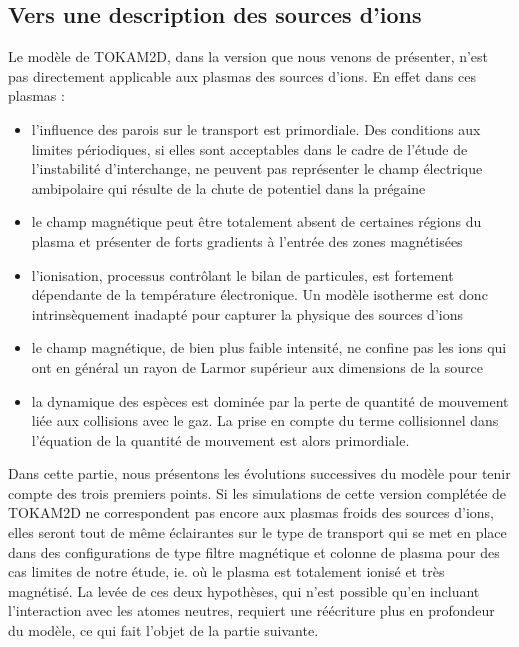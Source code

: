 \begin{refsection}
\section{Vers une description des sources d'ions}

Le modèle de TOKAM2D, dans la version que nous venons de présenter, n'est pas
directement applicable aux plasmas des sources d'ions. En effet dans
ces plasmas :

\begin{itemize}
	\item l'influence des parois sur le transport est primordiale. Des conditions
	aux limites périodiques, si elles sont acceptables dans le cadre de l'étude de
	l'instabilité d'interchange, ne peuvent pas représenter le champ électrique
	ambipolaire qui résulte de la chute de potentiel dans la prégaine
	\item le champ magnétique peut être
	totalement absent de certaines régions du plasma et présenter de forts
	gradients à l'entrée des zones magnétisées
	\item l'ionisation, processus contrôlant le bilan de particules, est fortement
	dépendante de la température électronique. Un modèle isotherme est donc
	intrinsèquement inadapté pour capturer la physique des sources d'ions
	\item le champ magnétique, de bien plus faible
	intensité, ne confine pas les ions qui ont en général un rayon de Larmor
	supérieur aux dimensions de la source
	\item la dynamique des espèces est dominée par la perte de
	quantité de mouvement liée aux collisions avec le gaz. La
	prise en compte du terme collisionnel dans l'équation de la quantité de
	mouvement est alors primordiale.
\end{itemize}

Dans cette partie, nous présentons les évolutions successives du modèle pour
tenir compte des trois premiers points. 
Si les simulations de
cette version complétée de TOKAM2D ne correspondent pas encore aux plasmas
froids des sources d'ions, elles seront tout de même éclairantes sur le type de
transport qui se met en place dans des configurations de type filtre magnétique
et colonne de plasma pour des cas limites de notre étude, ie. où le plasma est
totalement ionisé et très magnétisé. La levée de ces deux hypothèses,
qui n'est possible qu'en incluant l'interaction avec les atomes neutres,
requiert une réécriture plus en profondeur du modèle, ce qui fait l'objet de la
partie suivante.


\end{refsection}
